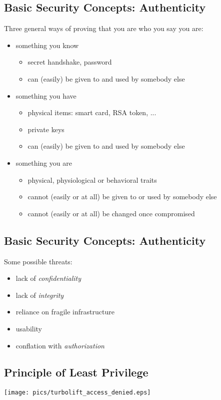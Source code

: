\documentclass[xga]{xdvislides}
\begin{document}
\subsection{Basic Security Concepts: Authenticity}
Three general ways of proving that you are who you say you are:
\begin{itemize}
	\item something you know
		\begin{itemize}
			\item secret handshake, password
			\item can (easily) be given to and used by somebody else
		\end{itemize}
	\item something you have
		\begin{itemize}
			\item physical items: smart card, RSA token, ...
			\item private keys
			\item can (easily) be given to and used by somebody else
		\end{itemize}
	\item something you are
		\begin{itemize}
			\item physical, physiological or behavioral traits
			\item cannot (easily or at all) be given to or
				used by somebody else
			\item cannot (easily or at all) be changed once
				compromised
		\end{itemize}
\end{itemize}

\subsection{Basic Security Concepts: Authenticity}
Some possible threats:
\begin{itemize}
	\item lack of {\em confidentiality}
	\item lack of {\em integrity}
	\item reliance on fragile infrastructure
	\item usability
	\item conflation with {\em authorization}
\end{itemize}

\subsection{Principle of Least Privilege}
\vspace*{\fill}
\begin{center}
	\texttt{[image: pics/turbolift\_access\_denied.eps]}
\end{center}
\vspace*{\fill}
\end{document}
